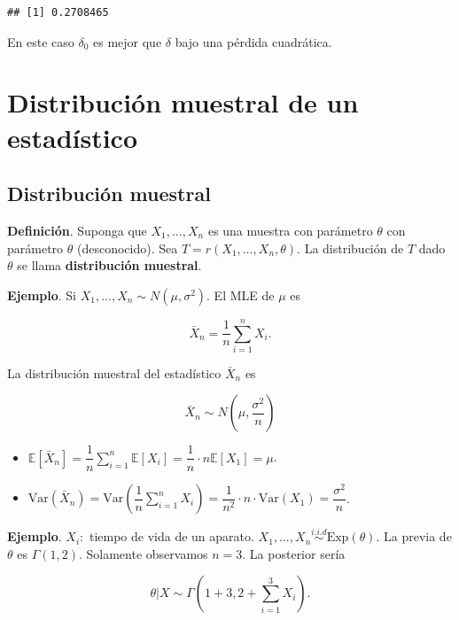 \documentclass[
  12pt,
]{book}
\begin{document}
\begin{verbatim}
## [1] 0.2708465
\end{verbatim}

En este caso \(\delta_0\) es mejor que \(\delta\) bajo una pérdida cuadrática.

\hypertarget{distribuciuxf3n-muestral-de-un-estaduxedstico}{%
\chapter{Distribución muestral de un estadístico}\label{distribuciuxf3n-muestral-de-un-estaduxedstico}}

\hypertarget{distribuciuxf3n-muestral}{%
\section{Distribución muestral}\label{distribuciuxf3n-muestral}}

\textbf{Definición}. Suponga que \(X_1,\dots,X_n\) es una muestra con parámetro
\(\theta\) con parámetro \(\theta\) (desconocido). Sea \(T=r(X_1,\dots,X_n,\theta)\). La
distribución de \(T\) dado \(\theta\) se llama \textbf{distribución muestral}.

\textbf{Ejemplo}. Si \(X_1,\dots,X_n \sim N(\mu,\sigma^2)\). El MLE de \(\mu\) es

\begin{equation*}
\bar X_n =\dfrac 1n \sum_{i=1}^n X_i.
\end{equation*}

La distribución muestral del estadístico \(\bar X_n\) es

\[
\bar X_n \sim N\left(\mu, \dfrac{\sigma^2}n \right)
\]

\begin{itemize}
\item
  \(\mathbb E[\bar X_n] = \dfrac 1n\displaystyle\sum_{i=1}^n\mathbb E[X_i] = \dfrac 1n\cdot n \mathbb E[X_1] = \mu\).
\item
  \(\text{Var}(\bar X_n) = \text{Var}\left(\dfrac 1n \displaystyle\sum_{i=1}^n X_i\right) = \dfrac{1}{n^2}\cdot n\cdot \text{Var}(X_1) = \dfrac{\sigma^2}n\).
\end{itemize}

\textbf{Ejemplo}. \(X_i:\) tiempo de vida de un aparato. \(X_1,\dots,X_n \stackrel{i.i.d}{\sim} \text{Exp}(\theta)\). La previa de \(\theta\) es \(\Gamma(1,2)\). Solamente
observamos \(n=3\). La posterior sería

\[
\theta|X \sim \Gamma(1+3,2+\sum_{i=1}^3 X_i). 
\]
\end{document}
